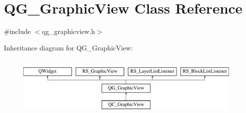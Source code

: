 \hypertarget{classQG__GraphicView}{\section{Q\-G\-\_\-\-Graphic\-View Class Reference}
\label{classQG__GraphicView}
}


{\ttfamily \#include $<$qg\-\_\-graphicview.\-h$>$}

Inheritance diagram for Q\-G\-\_\-\-Graphic\-View\-:\begin{figure}[H]
\begin{center}
\leavevmode
\includegraphics[height=3.000000cm]{classQG__GraphicView}
\end{center}
\end{figure}
